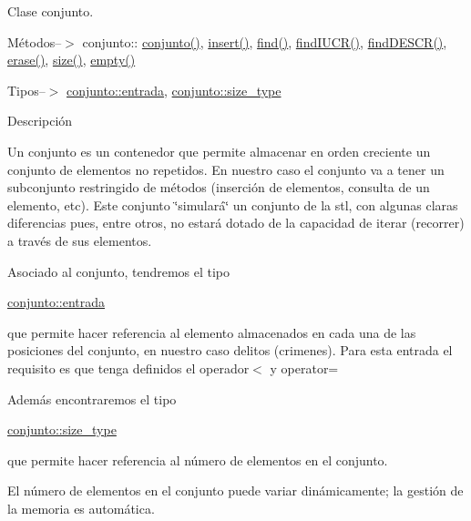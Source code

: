 Clase conjunto. 

Métodos--$>$ conjunto\+:\+: \hyperlink{classconjunto_ab634a250097d154d69a13bf8bde9fec7}{conjunto()}, \hyperlink{classconjunto_adb7f70590741e9f7db3a28de60f4452a}{insert()}, \hyperlink{classconjunto_a72ee85a4309acdd8274392fc4a765de4}{find()}, \hyperlink{classconjunto_a076dc70516af91c07b570bca24c6d9f7}{find\+I\+U\+C\+R()}, \hyperlink{classconjunto_ab4f2fdce330e5b53c3ac8f529ccd435d}{find\+D\+E\+S\+C\+R()}, \hyperlink{classconjunto_a92332298c1202e92027b48f01c69ae91}{erase()}, \hyperlink{classconjunto_af9962de5f6425f2030dc0e63015f85b3}{size()}, \hyperlink{classconjunto_a904716d6ae739f0461880b08138cf4e4}{empty()}

Tipos--$>$ \hyperlink{classconjunto_a7630ace7cb17bcec07daf5804f1a0780}{conjunto\+::entrada}, \hyperlink{classconjunto_a0cc9902da62790ec2a6d59f4559c2df5}{conjunto\+::size\+\_\+type}

Descripción

Un conjunto es un contenedor que permite almacenar en orden creciente un conjunto de elementos no repetidos. En nuestro caso el conjunto va a tener un subconjunto restringido de métodos (inserción de elementos, consulta de un elemento, etc). Este conjunto \char`\"{}simulará\char`\"{} un conjunto de la stl, con algunas claras diferencias pues, entre otros, no estará dotado de la capacidad de iterar (recorrer) a través de sus elementos.

Asociado al conjunto, tendremos el tipo
\begin{DoxyCode}
\hyperlink{classcrimen}{conjunto::entrada} 
\end{DoxyCode}
 que permite hacer referencia al elemento almacenados en cada una de las posiciones del conjunto, en nuestro caso delitos (crimenes). Para esta entrada el requisito es que tenga definidos el operador$<$ y operator=

Además encontraremos el tipo
\begin{DoxyCode}
\hyperlink{classconjunto_a0cc9902da62790ec2a6d59f4559c2df5}{conjunto::size\_type} 
\end{DoxyCode}
 que permite hacer referencia al número de elementos en el conjunto.

El número de elementos en el conjunto puede variar dinámicamente; la gestión de la memoria es automática.

